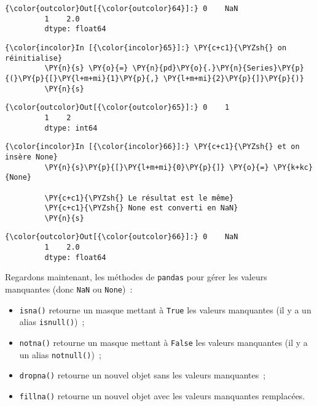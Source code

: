 \begin{Verbatim}[commandchars=\\\{\},frame=single,framerule=0.3mm,rulecolor=\color{cellframecolor}]
{\color{outcolor}Out[{\color{outcolor}64}]:} 0    NaN
         1    2.0
         dtype: float64
\end{Verbatim}
            
    \begin{Verbatim}[commandchars=\\\{\},frame=single,framerule=0.3mm,rulecolor=\color{cellframecolor}]
{\color{incolor}In [{\color{incolor}65}]:} \PY{c+c1}{\PYZsh{} on réinitialise}
         \PY{n}{s} \PY{o}{=} \PY{n}{pd}\PY{o}{.}\PY{n}{Series}\PY{p}{(}\PY{p}{[}\PY{l+m+mi}{1}\PY{p}{,} \PY{l+m+mi}{2}\PY{p}{]}\PY{p}{)}
         \PY{n}{s}
\end{Verbatim}


\begin{Verbatim}[commandchars=\\\{\},frame=single,framerule=0.3mm,rulecolor=\color{cellframecolor}]
{\color{outcolor}Out[{\color{outcolor}65}]:} 0    1
         1    2
         dtype: int64
\end{Verbatim}
            
    \begin{Verbatim}[commandchars=\\\{\},frame=single,framerule=0.3mm,rulecolor=\color{cellframecolor}]
{\color{incolor}In [{\color{incolor}66}]:} \PY{c+c1}{\PYZsh{} et on insère None}
         \PY{n}{s}\PY{p}{[}\PY{l+m+mi}{0}\PY{p}{]} \PY{o}{=} \PY{k+kc}{None}
         
         \PY{c+c1}{\PYZsh{} Le résultat est le même}
         \PY{c+c1}{\PYZsh{} None est converti en NaN}
         \PY{n}{s}
\end{Verbatim}


\begin{Verbatim}[commandchars=\\\{\},frame=single,framerule=0.3mm,rulecolor=\color{cellframecolor}]
{\color{outcolor}Out[{\color{outcolor}66}]:} 0    NaN
         1    2.0
         dtype: float64
\end{Verbatim}
            
    Regardons maintenant, les méthodes de \texttt{pandas} pour gérer les
valeurs manquantes (donc \texttt{NaN} ou \texttt{None})~:

\begin{itemize}
\tightlist
\item
  \texttt{isna()} retourne un masque mettant à \texttt{True} les valeurs
  manquantes (il y a un alias \texttt{isnull()})~;
\item
  \texttt{notna()} retourne un masque mettant à \texttt{False} les
  valeurs manquantes (il y a un alias \texttt{notnull()})~;
\item
  \texttt{dropna()} retourne un nouvel objet sans les valeurs
  manquantes~;
\item
  \texttt{fillna()} retourne un nouvel objet avec les valeurs manquantes
  remplacées.
\end{itemize}

